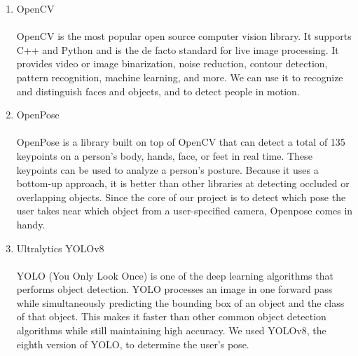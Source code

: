 \begin{enumerate}[label=\arabic*]
\begin{enumerate}[label=\alph*.]
              \item OpenCV\\
                    \\
                    OpenCV is the most popular open source computer vision library. It supports C++ and Python and is the de facto standard for live image processing. It provides video or image binarization, noise reduction, contour detection, pattern recognition, machine learning, and more. We can use it to recognize and distinguish faces and objects, and to detect people in motion. \\

              \item OpenPose\\
                    \\
                    OpenPose is a library built on top of OpenCV that can detect a total of 135 keypoints on a person's body, hands, face, or feet in real time. These keypoints can be used to analyze a person's posture. Because it uses a bottom-up approach, it is better than other libraries at detecting occluded or overlapping objects. Since the core of our project is to detect which pose the user takes near which object from a user-specified camera, Openpose comes in handy.\\

              \item Ultralytics YOLOv8\\
                    \\YOLO (You Only Look Once) is one of the deep learning algorithms that performs object detection. YOLO processes an image in one forward pass while simultaneously predicting the bounding box of an object and the class of that object. This makes it faster than other common object detection algorithms while still maintaining high accuracy. We used YOLOv8, the eighth version of YOLO, to determine the user's pose.\\
          \end{enumerate}


\end{enumerate}
